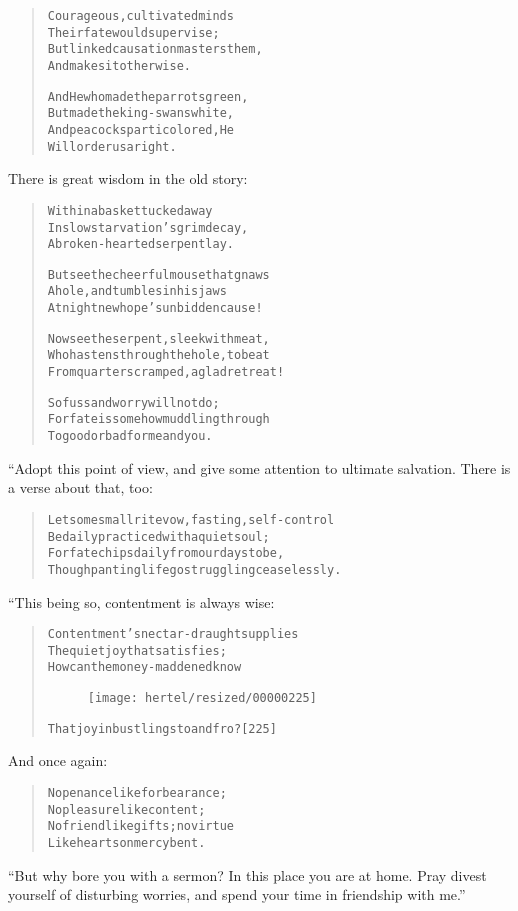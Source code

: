 \documentclass[article, twoside, 10pt]{memoir}
\renewenvironment{verbatim}{%
\begin{quote}%
\vskip -10pt%
\begin{alltt}\normalfont\small}{\end{alltt}%
\end{quote}%
\vskip -10pt
} %
\begin{document}
\begin{verbatim}
Courageous, cultivated minds
    Their fate would supervise;
But linked causation masters them,
    And makes it otherwise.

And He who made the parrots green,
    But made the king-swans white,
And peacocks particolored, He
    Will order us aright.
\end{verbatim}
There is great wisdom in the old story:

\begin{verbatim}
Within a basket tucked away
In slow starvation's grim decay,
A broken-hearted serpent lay.

But see the cheerful mouse that gnaws
A hole, and tumbles in his jaws
At night{\textemdash}new hope's unbidden cause!

Now see the serpent, sleek with meat,
Who hastens through the hole, to beat
From quarters cramped, a glad retreat!

So fuss and worry will not do;
For fate is somehow muddling through
To good or bad for me and you.
\end{verbatim}
“Adopt this point of view, and give some attention to ultimate
salvation. There is a verse about that, too:

\begin{verbatim}
Let some small rite{\textemdash}vow, fasting, self-control{\textemdash}
Be daily practiced with a quiet soul;
For fate chips daily from our days to be,
Though panting life go struggling ceaselessly.
\end{verbatim}
“This being so, contentment is always wise:

\begin{verbatim}
Contentment's nectar-draught supplies
The quiet joy that satisfies;
How can the money-maddened know
\begin{figure}[p]\texttt{[image: hertel/resized/00000225]}\end{figure}That joy in bustlings to and fro?                       [225]
\end{verbatim}
And once again:

\begin{verbatim}
No penance like forbearance;
    No pleasure like content;
No friend like gifts; no virtue
    Like hearts on mercy bent.
\end{verbatim}
``But why bore you with a sermon? In this place you are at home. Pray divest yourself of disturbing worries, and spend your time in friendship with me.''
\end{document}
